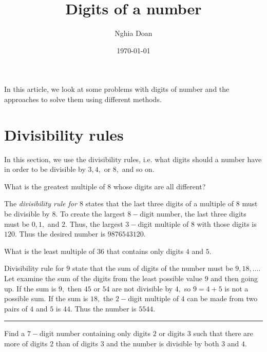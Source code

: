 \documentclass{article}
\title{Digits of a number}
\author{Nghia Doan}
\date{\today}
\begin{document}
\maketitle

In this article, we look at some problems with digits of number and the approaches to solve them using different methods.

\section{Divisibility rules}

In this section, we use the divisibility rules,
i.e. what digits should a number have in order to be divisible by $3, 4,$ or $8,$ and so on.

\begin{example*}[One]
    What is the greatest multiple of $8$ whose digits are all different?
\end{example*}

\begin{soln}
    The \textit{divisibility rule for $8$} states that
    the last three digits of a multiple of $8$ must be divisible by $8$.
    To create the largest $8-$digit number, the last three digits must be $0, 1,$ and $2.$
    Thus, the largest $3-$digit multiple of $8$ with those digits is $120.$
    Thus the desired number is $\boxed{9876543120.}$
\end{soln}
    
\begin{example*}[Two]
    What is the least multiple of $36$ that contains only digits $4$ and $5.$
\end{example*}

\begin{soln}
    Divisibility rule for $9$ state that the sum of digits of the number must be $9, 18, \ldots.$
    Let examine the sum of the digits from the least possible value $9$ and then going up.
    If the sum is $9,$ then $45$ or $54$ are not divisible by $4,$ so $9=4+5$ is not a possible sum.
    If the sum is $18,$ the $2-$digit multiple of $4$ can be made from two pairs of $4$ and $5$ is $44.$
    Thus the number is $\boxed{5544}.$
\end{soln}

\bigbreak

\noindent\rule{16.5cm}{0.4pt}

\begin{exercise*}[Three]
    \label{exercise:three}
    Find a $7-$digit number containing only digits $2$ or digits $3$ such that 
    there are more of digits $2$ than of digits $3$ and the number is divisible by both $3$ and $4.$
\end{exercise*}
\end{document}
